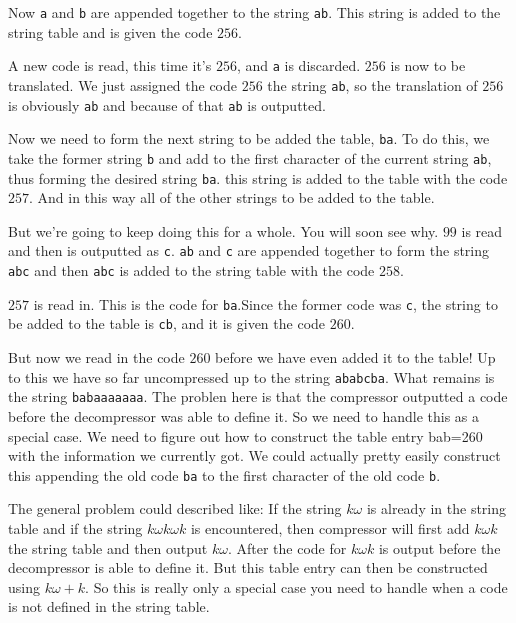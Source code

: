 \begin{refsection}
Now \texttt{a} and \texttt{b} are appended together to the string
\texttt{ab}. This string is added to the string table and is given the
code $256$.

A new code is read, this time it's $256$, and \texttt{a} is
discarded. $256$ is now to be translated. We just assigned the code
$256$ the string \texttt{ab}, so the translation of $256$ is obviously
\texttt{ab} and because of that \texttt{ab} is outputted.

Now we need to form the next string to be added the table,
\texttt{ba}. To do this, we take the former string \texttt{b} and add
to the first character of the current string \texttt{ab}, thus forming
the desired string \texttt{ba}. this string is added to the table with
the code $257$. And in this way all of the other strings to be added
to the table.

But we're going to keep doing this for a whole. You will soon see
why. $99$ is read and then is outputted as \texttt{c}. \texttt{ab} and
\texttt{c} are appended together to form the string \texttt{abc} and then
\texttt{abc} is added to the string table with the code $258$.

$257$ is read in. This is the code for \texttt{ba}.Since the former
code was \texttt{c}, the string to be added to the table is
\texttt{cb}, and it is given the code $260$.

But now we read in the code $260$ before we have even added it to the
table! Up to this we have so far uncompressed up to the string
\texttt{ababcba}. What remains is the string \texttt{babaaaaaaa}. The
problen here is that the compressor outputted a code before the
decompressor was able to define it. So we need to handle this as a
special case. We need to figure out how to construct the table entry
bab=260 with the information we currently got. We could actually
pretty easily construct this appending the old code \texttt{ba} to the
first character of the old code \texttt{b}.

\newcommand{\ko}{\ensuremath{k\omega}\xspace}
\newcommand{\kok}{\ensuremath{\ko k}\xspace}
\newcommand{\kokok}{\ensuremath{\kok \omega k}\xspace}

The general problem could described like: If the string \ko is already
in the string table and if the string \kokok is encountered, then
compressor will first add \kok the string table and then output
\ko. After the code for \kok is output before the decompressor is able
to define it. But this table entry can then be constructed using $\ko
+k$.  So this is really only a special case you need to handle when a
code is not defined in the string table.


\end{refsection}

